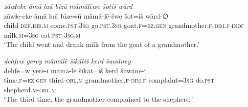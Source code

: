 \ea \label{KŠ.25}
\textit{zāwɫeke āmā luā bizū māmālēwe šotiš wārd} \\ 
\gll zāwɫe-eke āmā luā bize=ū māmā-lē-ēwe šot=iš wārd-∅ \\ 
 child\textsc{-def}\textsc{.dir}\textsc{.m} come\textsc{.pst}\textsc{.3sg} go\textsc{.pst}\textsc{.3sg} goat\textsc{.f}\textsc{=ez.gen} grandmother\textsc{.f}\textsc{-dim}\textsc{.f}\textsc{-indf} milk\textsc{.m}\textsc{=3sg} eat\textsc{.pst}\textsc{-3sg}\textsc{.m} \\ 
\glt `The child went and drank milk from the goat of a grandmother.'
\z 
 
\ea \label{KŠ.27}
\textit{dehfew yerey māmālē šikātiš kerd šuwāney} \\ 
\gll dehfe=w yere-ī māmā-lē šikāt=iš kerd šuwāne-ī \\ 
 time\textsc{.f}\textsc{=ez.gen} third\textsc{-obl}\textsc{.m} grandmother\textsc{.f}\textsc{-dim}\textsc{.f} complaint\textsc{=3sg} do\textsc{.pst} shepherd\textsc{.m}\textsc{-obl}\textsc{.m} \\ 
\glt `The third time, the grandmother complained to the shepherd.'
\z 
 
